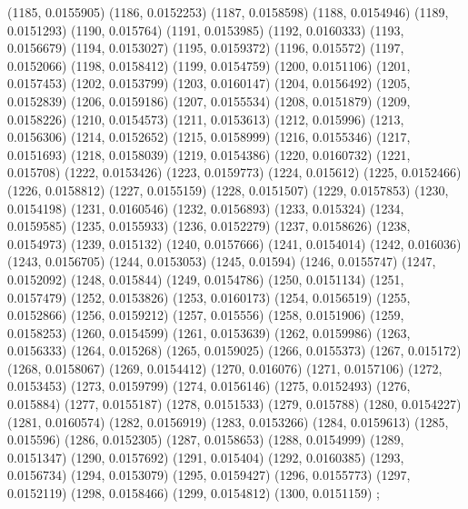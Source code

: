 {					(1185, 0.0155905)
					(1186, 0.0152253)
					(1187, 0.0158598)
					(1188, 0.0154946)
					(1189, 0.0151293)
					(1190, 0.015764)
					(1191, 0.0153985)
					(1192, 0.0160333)
					(1193, 0.0156679)
					(1194, 0.0153027)
					(1195, 0.0159372)
					(1196, 0.015572)
					(1197, 0.0152066)
					(1198, 0.0158412)
					(1199, 0.0154759)
					(1200, 0.0151106)
					(1201, 0.0157453)
					(1202, 0.0153799)
					(1203, 0.0160147)
					(1204, 0.0156492)
					(1205, 0.0152839)
					(1206, 0.0159186)
					(1207, 0.0155534)
					(1208, 0.0151879)
					(1209, 0.0158226)
					(1210, 0.0154573)
					(1211, 0.0153613)
					(1212, 0.015996)
					(1213, 0.0156306)
					(1214, 0.0152652)
					(1215, 0.0158999)
					(1216, 0.0155346)
					(1217, 0.0151693)
					(1218, 0.0158039)
					(1219, 0.0154386)
					(1220, 0.0160732)
					(1221, 0.015708)
					(1222, 0.0153426)
					(1223, 0.0159773)
					(1224, 0.015612)
					(1225, 0.0152466)
					(1226, 0.0158812)
					(1227, 0.0155159)
					(1228, 0.0151507)
					(1229, 0.0157853)
					(1230, 0.0154198)
					(1231, 0.0160546)
					(1232, 0.0156893)
					(1233, 0.015324)
					(1234, 0.0159585)
					(1235, 0.0155933)
					(1236, 0.0152279)
					(1237, 0.0158626)
					(1238, 0.0154973)
					(1239, 0.015132)
					(1240, 0.0157666)
					(1241, 0.0154014)
					(1242, 0.016036)
					(1243, 0.0156705)
					(1244, 0.0153053)
					(1245, 0.01594)
					(1246, 0.0155747)
					(1247, 0.0152092)
					(1248, 0.015844)
					(1249, 0.0154786)
					(1250, 0.0151134)
					(1251, 0.0157479)
					(1252, 0.0153826)
					(1253, 0.0160173)
					(1254, 0.0156519)
					(1255, 0.0152866)
					(1256, 0.0159212)
					(1257, 0.015556)
					(1258, 0.0151906)
					(1259, 0.0158253)
					(1260, 0.0154599)
					(1261, 0.0153639)
					(1262, 0.0159986)
					(1263, 0.0156333)
					(1264, 0.015268)
					(1265, 0.0159025)
					(1266, 0.0155373)
					(1267, 0.015172)
					(1268, 0.0158067)
					(1269, 0.0154412)
					(1270, 0.016076)
					(1271, 0.0157106)
					(1272, 0.0153453)
					(1273, 0.0159799)
					(1274, 0.0156146)
					(1275, 0.0152493)
					(1276, 0.015884)
					(1277, 0.0155187)
					(1278, 0.0151533)
					(1279, 0.015788)
					(1280, 0.0154227)
					(1281, 0.0160574)
					(1282, 0.0156919)
					(1283, 0.0153266)
					(1284, 0.0159613)
					(1285, 0.015596)
					(1286, 0.0152305)
					(1287, 0.0158653)
					(1288, 0.0154999)
					(1289, 0.0151347)
					(1290, 0.0157692)
					(1291, 0.015404)
					(1292, 0.0160385)
					(1293, 0.0156734)
					(1294, 0.0153079)
					(1295, 0.0159427)
					(1296, 0.0155773)
					(1297, 0.0152119)
					(1298, 0.0158466)
					(1299, 0.0154812)
					(1300, 0.0151159)
				};
